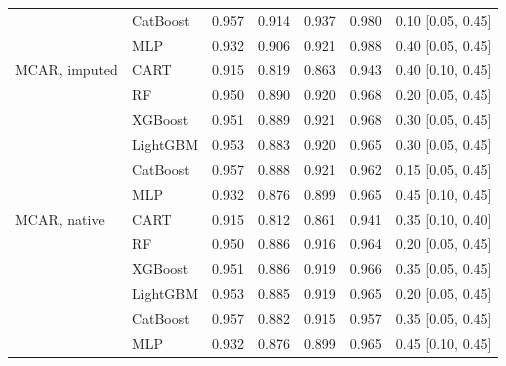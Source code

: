 \documentclass[pdflatex,sn-mathphys]{sn-jnl}
\theoremstyle{thmstyleone}
\begin{document}
\begin{table}[htbp]
\begin{tabular}{@{}llrrrrl@{}}
 & CatBoost & 0.957 & 0.914 & 0.937 & 0.980 & 0.10 [0.05, 0.45] \\
 & MLP & 0.932 & 0.906 & 0.921 & 0.988 & 0.40 [0.05, 0.45] \\
\midrule
MCAR, imputed & CART & 0.915 & 0.819 & 0.863 & 0.943 & 0.40 [0.10, 0.45] \\
 & RF & 0.950 & 0.890 & 0.920 & 0.968 & 0.20 [0.05, 0.45] \\
 & XGBoost & 0.951 & 0.889 & 0.921 & 0.968 & 0.30 [0.05, 0.45] \\
 & LightGBM & 0.953 & 0.883 & 0.920 & 0.965 & 0.30 [0.05, 0.45] \\
 & CatBoost & 0.957 & 0.888 & 0.921 & 0.962 & 0.15 [0.05, 0.45] \\
 & MLP & 0.932 & 0.876 & 0.899 & 0.965 & 0.45 [0.10, 0.45] \\
\midrule
MCAR, native & CART & 0.915 & 0.812 & 0.861 & 0.941 & 0.35 [0.10, 0.40] \\
 & RF & 0.950 & 0.886 & 0.916 & 0.964 & 0.20 [0.05, 0.45] \\
 & XGBoost & 0.951 & 0.886 & 0.919 & 0.966 & 0.35 [0.05, 0.45] \\
 & LightGBM & 0.953 & 0.885 & 0.919 & 0.965 & 0.20 [0.05, 0.45] \\
 & CatBoost & 0.957 & 0.882 & 0.915 & 0.957 & 0.35 [0.05, 0.45] \\
 & MLP & 0.932 & 0.876 & 0.899 & 0.965 & 0.45 [0.10, 0.45] \\
\bottomrule
\end{tabular}
\end{table}
\end{document}
